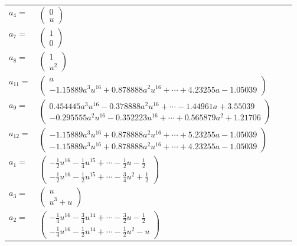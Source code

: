 \documentclass[1p]{elsarticle_modified}
\theoremstyle{definition}
\begin{document}
\begin{tabular}{m{7pt} m{180pt} m{7pt} m{180pt} }
\flushright $a_{4}=$&$\begin{pmatrix}0\\u\end{pmatrix}$ \\
\flushright $a_{7}=$&$\begin{pmatrix}1\\0\end{pmatrix}$ \\
\flushright $a_{8}=$&$\begin{pmatrix}1\\u^2\end{pmatrix}$ \\
\flushright $a_{11}=$&$\begin{pmatrix}a\\-1.15889 a^{3} u^{16}+0.878888 a^{2} u^{16}+\cdots+4.23255 a-1.05039\end{pmatrix}$ \\
\flushright $a_{9}=$&$\begin{pmatrix}0.454445 a^{3} u^{16}-0.378888 a^{2} u^{16}+\cdots-1.44961 a+3.55039\\-0.295555 a^{2} u^{16}-0.352223 u^{16}+\cdots+0.565879 a^{2}+1.21706\end{pmatrix}$ \\
\flushright $a_{12}=$&$\begin{pmatrix}-1.15889 a^{3} u^{16}+0.878888 a^{2} u^{16}+\cdots+5.23255 a-1.05039\\-1.15889 a^{3} u^{16}+0.878888 a^{2} u^{16}+\cdots+4.23255 a-1.05039\end{pmatrix}$ \\
\flushright $a_{1}=$&$\begin{pmatrix}-\frac{1}{2} u^{16}-\frac{1}{4} u^{15}+\cdots-\frac{1}{2} u-\frac{1}{2}\\-\frac{1}{2} u^{16}-\frac{1}{2} u^{15}+\cdots-\frac{3}{4} u^2+\frac{1}{2}\end{pmatrix}$ \\
\flushright $a_{3}=$&$\begin{pmatrix}u\\u^3+u\end{pmatrix}$ \\
\flushright $a_{2}=$&$\begin{pmatrix}-\frac{1}{4} u^{16}-\frac{3}{4} u^{14}+\cdots-\frac{3}{2} u-\frac{1}{2}\\-\frac{1}{4} u^{16}-\frac{1}{2} u^{14}+\cdots-\frac{1}{2} u^2- u\end{pmatrix}$ \\

\end{tabular}
\end{document}
